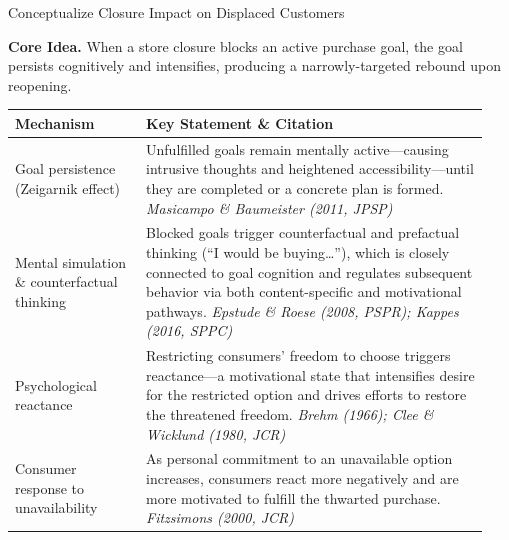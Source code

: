 \documentclass[aspectratio=169]{beamer}  %
\begin{document}
\begin{frame}{Conceptualize Closure Impact on Displaced Customers}
\footnotesize

\textbf{Core Idea.}
When a store closure blocks an active purchase goal, the goal
persists cognitively and intensifies, producing a narrowly-targeted
rebound upon reopening.

\vspace{0.5cm}

\medskip
\tiny
\begin{tabular}{@{} p{0.26\linewidth} p{0.68\linewidth} @{}}
\toprule
\textbf{Mechanism} & \textbf{Key Statement \& Citation} \\
\midrule
Goal persistence (Zeigarnik effect) &
Unfulfilled goals remain mentally active---causing intrusive
thoughts and heightened accessibility---until they are completed
or a concrete plan is formed.
\newline
\textit{Masicampo \& Baumeister (2011, JPSP)} \\
\addlinespace[4pt]
Mental simulation \& counterfactual thinking &
Blocked goals trigger counterfactual and prefactual thinking
(``I would be buying\ldots''), which is closely connected to
goal cognition and regulates subsequent behavior via both
content-specific and motivational pathways.
\newline
\textit{Epstude \& Roese (2008, PSPR);
Kappes (2016, SPPC)} \\
\addlinespace[4pt]
Psychological reactance &
Restricting consumers' freedom to choose triggers reactance---a
motivational state that intensifies desire for the restricted
option and drives efforts to restore the threatened freedom.
\newline
\textit{Brehm (1966); Clee \& Wicklund (1980, JCR)} \\
\addlinespace[4pt]
Consumer response to unavailability &
As personal commitment to an unavailable option increases,
consumers react more negatively and are more motivated
to fulfill the thwarted purchase.
\newline
\textit{Fitzsimons (2000, JCR)} \\
\bottomrule
\end{tabular}
\end{frame}
\end{document}
